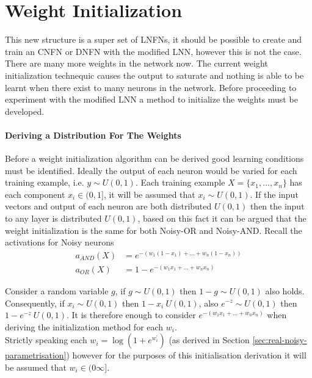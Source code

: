 \section{Weight Initialization}

This new structure is a super set of LNFNs, it should be possible to create and train an CNFN or DNFN with the modified LNN, however this is not the case. There are many more weights in the network now. The current weight initialization technequic causes the output to saturate and nothing is able to be learnt when there exist to many neurons in the network. Before proceeding to experiment with the modified LNN a method to initialize the weights must be developed.\\

\paragraph{Deriving a Distribution For The Weights}
Before a weight initialization algorithm can be derived good learning conditions must be identified. Ideally the output of each neuron would be varied for each training example, i.e. $y \sim U(0,1)$. Each training example $X = \{x_1, ..., x_n\}$ has each component $x_i \in (0,1]$, it will be assumed that $x_i \sim U(0,1)$. If the input vectors and output of each neuron are both distributed $U(0,1)$ then the input to any layer is distributed $U(0,1)$, based on this fact it can be argued that the weight initialization is the same for both Noisy-OR and Noisy-AND. Recall the activations for Noisy neurons\\

\begin{align*}
	a_{AND}(X) &= e^{-(w_1(1 - x_1) + ... + w_n(1 - x_n))}\\
	a_{OR}(X) &= 1 - e^{-(w_1x_1 + ... + w_nx_n)}
\end{align*}

Consider a random variable $g$, if $g \sim U(0,1)$ then $1 - g \sim U(0,1)$ also holds. Consequently, if $x_i \sim U(0,1)$ then $1 - x_i ~ U(0,1)$, also $e^{-z} \sim U(0,1)$ then $1 - e^{-z} ~ U(0,1)$. It is therefore enough to consider $e^{-(w_1x_1 + ... + w_nx_n)}$ when deriving the initialization method for each $w_i$.\\

Strictly speaking each $w_i = \log(1 + e^{w^{'}_i})$ (as derived in Section \ref{sec:real-noisy-parametrisation}) however for the purposes of this initialisation derivation it will be assumed that $w_i \in (0 \infty]$.\\

